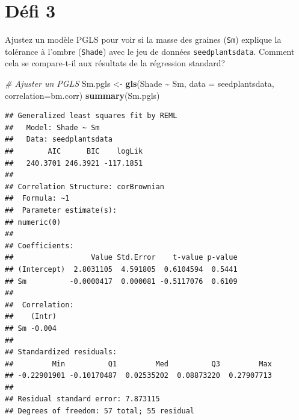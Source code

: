 \documentclass[
]{book}
\newenvironment{Shaded}{\begin{snugshade}}{\end{snugshade}}
\newcommand{\AttributeTok}[1]{\textcolor[rgb]{0.13,0.29,0.53}{#1}}
\newcommand{\CommentTok}[1]{\textcolor[rgb]{0.56,0.35,0.01}{\textit{#1}}}
\newcommand{\FunctionTok}[1]{\textcolor[rgb]{0.13,0.29,0.53}{\textbf{#1}}}
\newcommand{\NormalTok}[1]{#1}
\newcommand{\OtherTok}[1]{\textcolor[rgb]{0.56,0.35,0.01}{#1}}
\newcommand{\SpecialCharTok}[1]{\textcolor[rgb]{0.81,0.36,0.00}{\textbf{#1}}}
\begin{document}
\section{Défi 3}\label{duxe9fi-3}

Ajustez un modèle PGLS pour voir si la masse des graines (\texttt{Sm}) explique la tolérance à l'ombre (\texttt{Shade}) avec le jeu de données \texttt{seedplantsdata}. Comment cela se compare-t-il aux résultats de la régression standard?

\begin{Shaded}
\begin{Highlighting}[]
\CommentTok{\# Ajuster un PGLS}
\NormalTok{Sm.pgls }\OtherTok{\textless{}{-}} \FunctionTok{gls}\NormalTok{(Shade }\SpecialCharTok{\textasciitilde{}}\NormalTok{ Sm, }\AttributeTok{data =}\NormalTok{ seedplantsdata, }\AttributeTok{correlation=}\NormalTok{bm.corr)}
\FunctionTok{summary}\NormalTok{(Sm.pgls)}
\end{Highlighting}
\end{Shaded}

\begin{verbatim}
## Generalized least squares fit by REML
##   Model: Shade ~ Sm 
##   Data: seedplantsdata 
##        AIC      BIC    logLik
##   240.3701 246.3921 -117.1851
## 
## Correlation Structure: corBrownian
##  Formula: ~1 
##  Parameter estimate(s):
## numeric(0)
## 
## Coefficients:
##                  Value Std.Error    t-value p-value
## (Intercept)  2.8031105  4.591805  0.6104594  0.5441
## Sm          -0.0000417  0.000081 -0.5117076  0.6109
## 
##  Correlation: 
##    (Intr)
## Sm -0.004
## 
## Standardized residuals:
##         Min          Q1         Med          Q3         Max 
## -0.22901901 -0.10170487  0.02535202  0.08873220  0.27907713 
## 
## Residual standard error: 7.873115 
## Degrees of freedom: 57 total; 55 residual
\end{verbatim}
\end{document}
